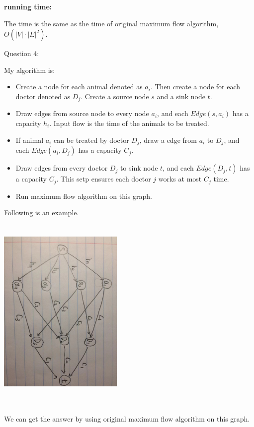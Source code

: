 \documentclass[12pt]{article}
\begin{document}
\textbf{running time:} \par
The time is the same as the time of original maximum flow algorithm, $O(|V|\cdot|E|^2)$.



\pagebreak
\noindent
\large Question 4: \par
\normalsize 
My algorithm is: 

\begin{itemize}
  \item Create a node for each animal denoted as $a_i$. Then create a node for each doctor denoted as $D_j$. Create a source node $s$ and a sink node $t$. 
  \item Draw edges from source node to every node $a_i$, and each $Edge(s, a_i)$ has a capacity $h_i$.
	Input flow is the time of the animals to be treated.
  \item If animal $a_i$ can be treated by doctor $D_j$, draw a edge from $a_i$ to $D_j$, and each $Edge(a_i, D_j)$ has a capacity $C_j$.
  \item Draw edges from every doctor $D_j$ to sink node $t$, and each $Edge(D_j, t)$ has a capacity $C_j$. 
	This setp ensures each doctor $j$ works at most $C_j$ time. 
  \item Run maximum flow algorithm on this graph. 

\end{itemize}

Following is an example. \\
\includegraphics[width=6cm, height=10cm, angle=90,origin=c]{question4}
\par
We can get the answer by using original maximum flow algorithm on this graph.
\\
\end{document}
